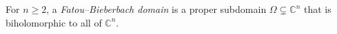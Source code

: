 
For $n\ge2$, a \emph{Fatou–Bieberbach domain} is a proper subdomain $\Omega\subsetneq\mathbb C^n$ that is biholomorphic to all of $\mathbb C^n$.
